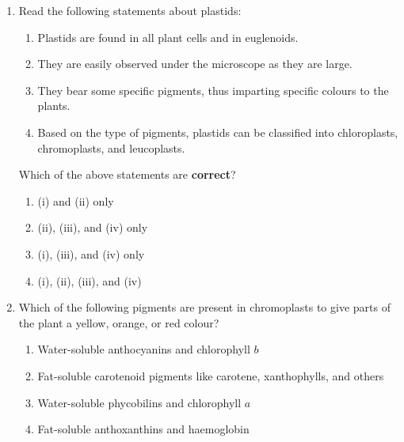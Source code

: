 \documentclass[11pt, a4paper]{article}
\begin{document}
\begin{enumerate}[label=\textbf{\arabic*.}, leftmargin=*, itemsep=8pt]
    \item Read the following statements about plastids:
    \begin{enumerate}[label=(\roman*)]
        \item Plastids are found in all plant cells and in euglenoids.
        \item They are easily observed under the microscope as they are large.
        \item They bear some specific pigments, thus imparting specific colours to the plants.
        \item Based on the type of pigments, plastids can be classified into chloroplasts, chromoplasts, and leucoplasts.
    \end{enumerate}
    Which of the above statements are \textbf{correct}?
    \begin{enumerate}[label=(\alph*)]
        \item (i) and (ii) only
        \item (ii), (iii), and (iv) only
        \item (i), (iii), and (iv) only
        \item (i), (ii), (iii), and (iv)
    \end{enumerate}

    \item Which of the following pigments are present in chromoplasts to give parts of the plant a yellow, orange, or red colour?
    \begin{enumerate}[label=(\alph*)]
        \item Water-soluble anthocyanins and chlorophyll $b$
        \item Fat-soluble carotenoid pigments like carotene, xanthophylls, and others
        \item Water-soluble phycobilins and chlorophyll $a$
        \item Fat-soluble anthoxanthins and haemoglobin
    \end{enumerate}


\end{enumerate}
\end{document}
